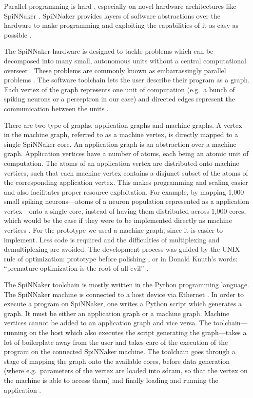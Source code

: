 \documentclass[]{article}
\begin{document}
Parallel programming is hard \citep{lee_2011}, especially on novel
hardware architectures like SpiNNaker \citep{brown_et_al_2015}.
SpiNNaker provides layers of software abstractions over the hardware
to make programming and exploiting the capabilities of it as easy as
possible \citep{furber_et_al_2020}.

The SpiNNaker hardware is designed to tackle problems which can be
decomposed into many small, autonomous units without a central
computational overseer \citep{brown_et_al_2015}.
These problems are commonly known as embarrassingly parallel problems
\citep{foster_1995}.
The software toolchain lets the user describe their program as a
graph.
Each vertex of the graph represents one unit of computation
(e.g.\ a bunch of spiking neurons or a perceptron in our case)
and directed edges represent the communication between the units
\citep{furber_et_al_2020}.

There are two type of graphs, application graphs and machine graphs.
A vertex in the machine graph, referred to as a machine vertex, is
directly mapped to a single SpiNNaker core.
An application graph is an abstraction over a machine graph.
Application vertices have a number of atoms, each being an atomic unit
of computation.
The atoms of an application vertex are distributed onto machine
vertices, such that each machine vertex contains a disjunct subset
of the atoms of the corresponding application vertex.
This makes programming and scaling easier and also facilitates proper
resource exploitation.
For example, by mapping 1,000 small spiking
neurons---atoms of a neuron population represented as a application
vertex---onto a single core, instead of having them distributed across
1,000 cores, which would be the case if they were to be implemented
directly as machine vertices \citep{furber_et_al_2020}.
For the prototype we used a machine graph, since it is easier to
implement.
Less code is required and the difficulties of multiplexing and
demultiplexing are avoided.
The development process was guided by the UNIX rule of optimization:
prototype before polishing \citep{raymond_2003}, or in Donald Knuth's
words: ``premature optimization is the root of all evil''
\citep{knuth_1974}.

The SpiNNaker toolchain is mostly written in the Python programming
language.
The SpiNNaker machine is connected to a host device via Ethernet
\citep{rowley_et_al_2019}.
In order to execute a program on SpiNNaker, one writes a Python
script which generates a graph.
It must be either an application graph or a machine graph.
Machine vertices cannot be added to an application graph and vice
versa.
The toolchain---running on the host which also executes the script
generating the graph---takes a lot of boilerplate away from the user
and takes care of the execution of the program on the connected
SpiNNaker machine.
The toolchain goes through a stage of mapping the graph onto the
available cores, before data generation (where e.g.\ parameters of the
vertex are loaded into \acrshort{sdram}, so that the vertex on the machine is
able to access them) and finally loading and running the
application \citep{furber_et_al_2020}.
\end{document}
